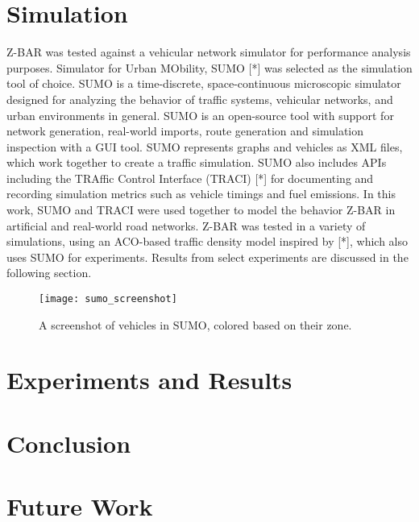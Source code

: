 \documentclass[conference]{IEEEtran}
\begin{document}
\section{Simulation}

Z-BAR was tested against a vehicular network simulator for performance analysis purposes. Simulator for Urban MObility, SUMO [*] was selected as the simulation tool of choice. SUMO is a time-discrete, space-continuous microscopic simulator designed for analyzing the behavior of traffic systems, vehicular networks, and urban environments in general. SUMO is an open-source tool with support for network generation, real-world imports, route generation and simulation inspection with a GUI tool. SUMO represents graphs and vehicles as XML files, which work together to create a traffic simulation. SUMO also includes APIs including the TRAffic Control Interface (TRACI) [*] for documenting and recording simulation metrics such as vehicle timings and fuel emissions. In this work, SUMO and TRACI were used together to model the behavior Z-BAR in artificial and real-world road networks. Z-BAR was tested in a variety of simulations, using an ACO-based traffic density model inspired by [*], which also uses SUMO for experiments. Results from select experiments are discussed in the following section.

\begin{figure}[h]
\caption{A screenshot of vehicles in SUMO, colored based on their zone.}
\centering
\texttt{[image: sumo\_screenshot]}
\end{figure}

\section{Experiments and Results} %

\section{Conclusion} %

\section{Future Work} %

\begin{thebibliography}{1}
\bibitem{}
\end{thebibliography}
\end{document}

